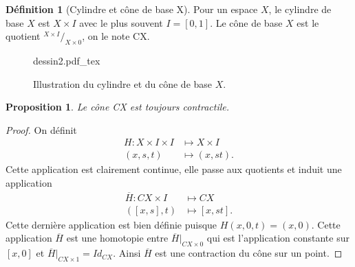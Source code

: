 \documentclass[12pt]{book}
\newcommand{\incfig}[1]{%
    \def\svgwidth{\columnwidth}
    {#1.pdf_tex} 
}
\newtheorem{prop}[lemma]{Proposition}
\theoremstyle{definition}
\newtheorem{definition}[lemma]{Définition}
\theoremstyle{remark}
\newcommand*\quot[2]{{^{\textstyle #1}\big/_{\textstyle #2}}}
\begin{document}
	\begin{definition}[Cylindre et cône de base X]
		Pour un espace $X$, le cylindre de base $X$ est $X \times I$ avec le plus souvent $I = [0,1]$.
		Le cône de base $X$ est le quotient $\quot{X\times I}{X \times 0}$, on le note CX.
	\end{definition}

	\begin{figure}[ht]
	    \centering
	    \incfig{dessin2}
	    \caption{Illustration du cylindre et du cône de base $X$.}
	\end{figure}

	\begin{prop}
		Le cône CX est toujours contractile.	
	\end{prop}
	\begin{proof}
		On définit 
		\begin{align*}
			H : X \times I \times I &\longmapsto X \times I \\
			(x,s,t) &\longmapsto (x,st)
		.\end{align*}
		Cette application est clairement continue, elle passe aux quotients et induit une application
		\begin{align*}
			\overline{H} : CX \times I &\longmapsto CX \\
			([x,s],t) &\longmapsto [x,st]
		.\end{align*}
		Cette dernière application est bien définie puisque $H(x,0,t) = (x,0)$. Cette application  $\overline{H}$ est une homotopie entre $\overline{H} \vert_{CX \times 0}$
		qui est l'application constante sur $[x,0]$ et $\overline{H} \vert _{CX \times 1} = Id_{CX}$.
		Ainsi  $\overline{H}$ est une contraction du cône sur un point.
	\end{proof}
\end{document}
